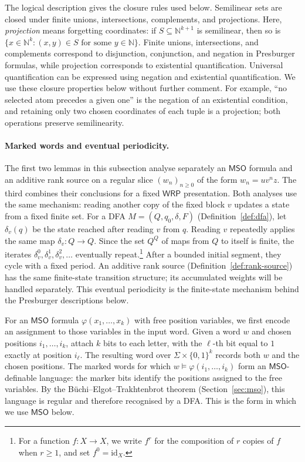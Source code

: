 \documentclass[11pt]{article}
\theoremstyle{definition}
\newcommand{\N}{\mathbb N}
\newcommand{\WRP}{\mathsf{WRP}}
\newcommand{\MSO}{\mathsf{MSO}}
\begin{document}
The logical description gives the closure rules used below.  Semilinear sets
are closed under finite unions, intersections, complements, and projections.
Here, \emph{projection} means forgetting coordinates: if
$S\subseteq\N^{k+1}$ is semilinear, then so is
$\{x\in\N^k:(x,y)\in S\text{ for some }y\in\N\}$.
Finite unions, intersections, and complements correspond to disjunction,
conjunction, and negation in Presburger formulas, while projection corresponds
to existential quantification.  Universal quantification can be expressed
using negation and existential quantification.  We use these closure properties
below without further comment.  For example, ``no selected atom precedes a
given one'' is the negation of an existential condition, and retaining only two
chosen coordinates of each tuple is a projection; both operations preserve
semilinearity.

\paragraph{Marked words and eventual periodicity.}
The first two lemmas in this subsection analyse separately an $\MSO$ formula
and an additive rank source on a regular slice $(w_n)_{n\ge0}$ of the form
$w_n=uv^nz$.  The third
combines their conclusions for a fixed $\WRP$ presentation.  Both analyses use
the same mechanism: reading another copy of the fixed block $v$ updates a state
from a fixed finite set.  For a DFA
$M=(Q,q_0,\delta,F)$ (Definition~\ref{def:dfa}), let $\delta_v(q)$ be the state
reached after reading $v$ from $q$.  Reading $v$ repeatedly applies the same map
$\delta_v\colon Q\to Q$.  Since the set $Q^Q$ of maps from $Q$ to itself is
finite, the iterates $\delta_v^0,\delta_v^1,\delta_v^2,\ldots$ eventually
repeat.\footnote{For a function $f\colon X\to X$, we write $f^r$ for the
composition of $r$ copies of $f$ when $r\ge 1$, and set
$f^0=\mathrm{id}_X$.}  After a bounded initial segment, they cycle with a fixed
period.  An additive
rank source (Definition~\ref{def:rank-source}) has the same finite-state
transition structure; its accumulated weights will be handled separately.
This eventual periodicity is the finite-state mechanism behind the Presburger
descriptions below.

For an $\MSO$ formula $\varphi(x_1,\ldots,x_k)$ with free position variables,
we first encode an assignment to those variables in the input word.  Given a
word $w$ and chosen positions $i_1,\ldots,i_k$, attach $k$ bits to each letter,
with the $\ell$-th bit equal to $1$ exactly at position $i_\ell$.  The resulting
word over $\Sigma\times\{0,1\}^k$ records both $w$ and the chosen positions.  The
marked words for which $w\models\varphi(i_1,\ldots,i_k)$ form an
$\MSO$-definable language: the marker bits identify the positions assigned to
the free variables.  By the B\"uchi--Elgot--Trakhtenbrot theorem
(Section~\ref{sec:mso}), this language is regular and therefore recognised by a
DFA.  This is the form in which we use $\MSO$ below.
\end{document}
